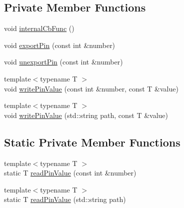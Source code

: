 \subsection*{Private Member Functions}
\begin{DoxyCompactItemize}
\item 
void \hyperlink{classo_cpt_1_1protocol_1_1gpio_aac8bfbf4530ff929ea83f48e970d0598}{internal\+Cb\+Func} ()
\item 
void \hyperlink{classo_cpt_1_1protocol_1_1gpio_af7fef4210406ea75eb04cc96fd99e7eb}{export\+Pin} (const int \&number)
\item 
void \hyperlink{classo_cpt_1_1protocol_1_1gpio_af6383ac93d965d156617147c652ae56f}{unexport\+Pin} (const int \&number)
\item 
{\footnotesize template$<$typename T $>$ }\\void \hyperlink{classo_cpt_1_1protocol_1_1gpio_a0f2972fa7ad1981c7edeae79280aa11f}{write\+Pin\+Value} (const int \&number, const T \&value)
\item 
{\footnotesize template$<$typename T $>$ }\\void \hyperlink{classo_cpt_1_1protocol_1_1gpio_a08e30d2b5451a628857d18b3b75e3265}{write\+Pin\+Value} (std\+::string path, const T \&value)
\end{DoxyCompactItemize}
\subsection*{Static Private Member Functions}
\begin{DoxyCompactItemize}
\item 
{\footnotesize template$<$typename T $>$ }\\static T \hyperlink{classo_cpt_1_1protocol_1_1gpio_aa604ec2008a852ec0f378b4c98fa3a3c}{read\+Pin\+Value} (const int \&number)
\item 
{\footnotesize template$<$typename T $>$ }\\static T \hyperlink{classo_cpt_1_1protocol_1_1gpio_a3e50919a9b9712884d4e868487821dc6}{read\+Pin\+Value} (std\+::string path)
\end{DoxyCompactItemize}

